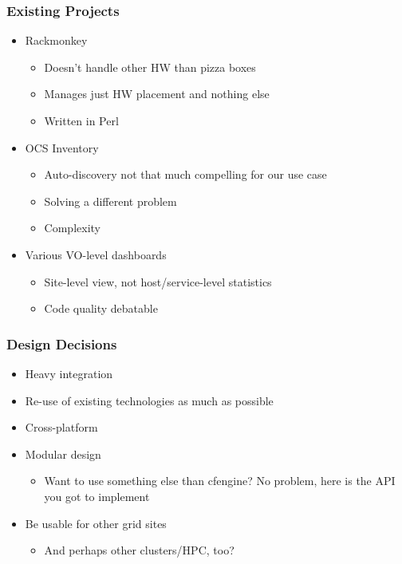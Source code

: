 \documentclass{beamer}
\begin{document}
\begin{frame}
\frametitle{Existing Projects}

\begin{itemize}
    \item Rackmonkey
        \begin{itemize}
            \item Doesn't handle other HW than pizza boxes
            \item Manages just HW placement and nothing else
            \item Written in Perl
        \end{itemize}
    \item OCS Inventory
        \begin{itemize}
            \item Auto-discovery not that much compelling for our use case
            \item Solving a different problem
            \item Complexity
        \end{itemize}
    \item Various VO-level dashboards
        \begin{itemize}
            \item Site-level view, not host/service-level statistics
            \item Code quality debatable
        \end{itemize}
\end{itemize}
\end{frame}

\begin{frame}
\frametitle{Design Decisions}

\begin{itemize}
    \item Heavy integration
    \item Re-use of existing technologies as much as possible
    \item Cross-platform
    \item Modular design
        \begin{itemize}
            \item Want to use something else than cfengine? No problem, here is
                the API you got to implement
        \end{itemize}
    \item Be usable for other grid sites
        \begin{itemize}
            \item And perhaps other clusters/HPC, too?
        \end{itemize}
\end{itemize}
\end{frame}
\end{document}
